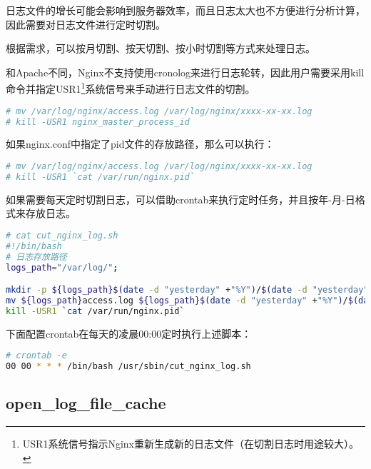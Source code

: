 日志文件的增长可能会影响到服务器效率，而且日志太大也不方便进行分析计算，因此需要对日志文件进行定时切割。

根据需求，可以按月切割、按天切割、按小时切割等方式来处理日志。

和Apache不同，Nginx不支持使用cronolog来进行日志轮转，因此用户需要采用kill命令并指定USR1\footnote{USR1系统信号指示Nginx重新生成新的日志文件（在切割日志时用途较大）。}系统信号来手动进行日志文件的切割。

\begin{lstlisting}[language=bash]
# mv /var/log/nginx/access.log /var/log/nginx/xxxx-xx-xx.log
# kill -USR1 nginx_master_process_id
\end{lstlisting}


\begin{compactitem}
\item 如果nginx.conf中指定了pid文件的存放路径，那么可以执行：

\begin{lstlisting}[language=bash]
# mv /var/log/nginx/access.log /var/log/nginx/xxxx-xx-xx.log
# kill -USR1 `cat /var/run/nginx.pid`
\end{lstlisting}

\item 如果需要每天定时切割日志，可以借助crontab来执行定时任务，并且按年-月-日格式来存放日志。

\begin{lstlisting}[language=bash]
# cat cut_nginx_log.sh
#!/bin/bash
# 日志存放路径
logs_path="/var/log/";

mkdir -p ${logs_path}$(date -d "yesterday" +"%Y")/$(date -d "yesterday" +"%m"/
mv ${logs_path}access.log ${logs_path}$(date -d "yesterday" +"%Y")/$(date -d "yesterday" +"%m")/access_$(date -d "yesterday" +"%Y%m%d").log
kill -USR1 `cat /var/run/nginx.pid`
\end{lstlisting}

\end{compactitem}

下面配置crontab在每天的凌晨00:00定时执行上述脚本：

\begin{lstlisting}[language=bash]
# crontab -e
00 00 * * * /bin/bash /usr/sbin/cut_nginx_log.sh
\end{lstlisting}



\subsection{open\_log\_file\_cache}



